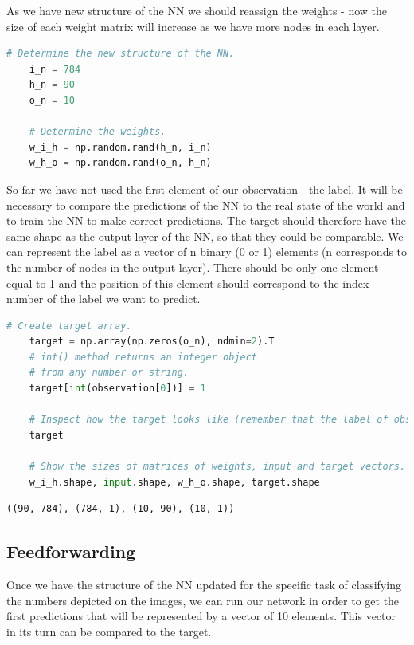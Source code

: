 As we have new structure of the NN we should reassign the weights - now the size of each weight matrix will increase as we have more nodes in each layer.

\begin{lstlisting}[language=Python]
    # Determine the new structure of the NN.
    i_n = 784
    h_n = 90
    o_n = 10
    
    # Determine the weights.
    w_i_h = np.random.rand(h_n, i_n)
    w_h_o = np.random.rand(o_n, h_n)
\end{lstlisting}

So far we have not used the first element of our observation - the label. It will be necessary to compare the predictions of the NN to the real state of the world and to train the NN to make correct predictions. The target should therefore have the same shape as the output layer of the NN, so that they could be comparable. We can represent the label as a vector of n binary (0 or 1) elements (n corresponds to the number of nodes in the output layer). There should be only one element equal to 1 and the position of this element should correspond to the index number of the label we want to predict.

\begin{lstlisting}[language=Python]
    # Create target array.
    target = np.array(np.zeros(o_n), ndmin=2).T
    # int() method returns an integer object
    # from any number or string.
    target[int(observation[0])] = 1 

    # Inspect how the target looks like (remember that the label of observations is 5).
    target

    # Show the sizes of matrices of weights, input and target vectors.
    w_i_h.shape, input.shape, w_h_o.shape, target.shape
\end{lstlisting}

\begin{lstlisting}
((90, 784), (784, 1), (10, 90), (10, 1))
\end{lstlisting}

\subsection{Feedforwarding}

Once we have the structure of the NN updated for the specific task of classifying the numbers depicted on the images, we can run our network in order to get the first predictions that will be represented by a vector of 10 elements. This vector in its turn can be compared to the target.


